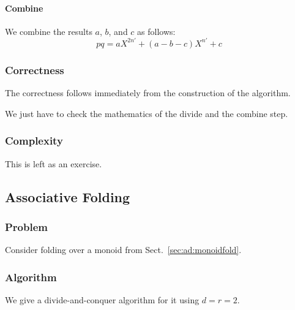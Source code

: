 \paragraph{Combine}
We combine the results $a$, $b$, and $c$ as follows:
 \[pq=a X^{2n'} + (a-b-c)X^{n'} + c\]

\subsubsection{Correctness}

The correctness follows immediately from the construction of the algorithm.

We just have to check the mathematics of the divide and the combine step.

\subsubsection{Complexity}

This is left as an exercise.


\subsection{Associative Folding}\label{sec:ad:monoidfold:divide}

\subsubsection{Problem}

Consider folding over a monoid from Sect.~\ref{sec:ad:monoidfold}.

\subsubsection{Algorithm}

We give a divide-and-conquer algorithm for it using $d=r=2$.

\begin{acode}
\end{acode}

